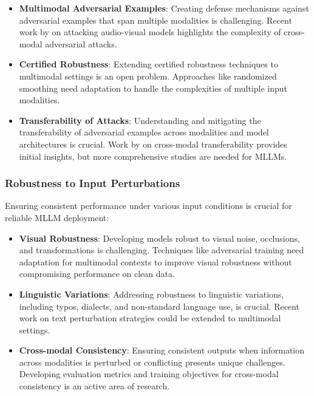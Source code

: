 \begin{itemize}
    \item \textbf{Multimodal Adversarial Examples}: Creating defense mechanisms against adversarial examples that span multiple modalities is challenging. Recent work by \citet{xu2018fooling} on attacking audio-visual models highlights the complexity of cross-modal adversarial attacks.
    
    \item \textbf{Certified Robustness}: Extending certified robustness techniques to multimodal settings is an open problem. Approaches like randomized smoothing \citep{cohen2019certified} need adaptation to handle the complexities of multiple input modalities.
    
    \item \textbf{Transferability of Attacks}: Understanding and mitigating the transferability of adversarial examples across modalities and model architectures is crucial. Work by \citet{naseer2019cross} on cross-modal transferability provides initial insights, but more comprehensive studies are needed for MLLMs.
\end{itemize}

\subsubsection{Robustness to Input Perturbations}
Ensuring consistent performance under various input conditions is crucial for reliable MLLM deployment:

\begin{itemize}
    \item \textbf{Visual Robustness}: Developing models robust to visual noise, occlusions, and transformations is challenging. Techniques like adversarial training \citep{madry2018towards} need adaptation for multimodal contexts to improve visual robustness without compromising performance on clean data.
    
    \item \textbf{Linguistic Variations}: Addressing robustness to linguistic variations, including typos, dialects, and non-standard language use, is crucial. Recent work on text perturbation strategies \citep{tan2020mind} could be extended to multimodal settings.
    
    \item \textbf{Cross-modal Consistency}: Ensuring consistent outputs when information across modalities is perturbed or conflicting presents unique challenges. Developing evaluation metrics and training objectives for cross-modal consistency is an active area of research.
\end{itemize}

